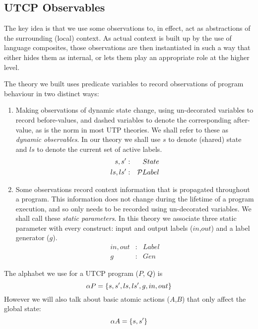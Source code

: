 \subsection{UTCP Observables}

The key idea is that we use some observations to,
in effect, act as abstractions of the surrounding (local) context.
As actual context is built up by the use of language composites,
those observations are then instantiated in such a way
that either hides them as internal,
or lets them play an appropriate role at the higher level.

The theory we built uses predicate variables
to record observations of program behaviour
in two distinct ways:
\begin{enumerate}
  \item
    Making observations of dynamic state change,
    using un-decorated variables to record before-values,
    and dashed variables to denote the corresponding after-value,
    as is the norm in most UTP theories.
    We shall refer to these as \emph{dynamic observables}.
    In our theory we shall use $s$ to denote (shared) state
    and $ls$ to denote the current set of active labels.
    \begin{eqnarray*}
       s,s' &:& State
    \\ ls,ls' &:& \mathcal P Label
    \end{eqnarray*}
  \item
    Some observations record context information that
    is propagated throughout a program.
    This information does not change during the lifetime of a program execution,
    and so only needs to be recorded using un-decorated variables.
    We shall call these \emph{static parameters}.
    In this theory we associate three static parameter with every construct: input and output labels ($in$,$out$)
    and a label generator ($g$).
    \begin{eqnarray*}
       in, out &:& Label
    \\ g &:& Gen
    \end{eqnarray*}
\end{enumerate}
The alphabet we use for a UTCP program ($P$, $Q$)  is
\begin{equation*}
  \alpha P = \{{s,s',ls,ls',g,in,out}\}
\end{equation*}
However we will also talk about basic atomic actions ($A$,$B$)
that only affect the global state:
\begin{equation*}
  \alpha A = \{{s,s'}\}
\end{equation*}

